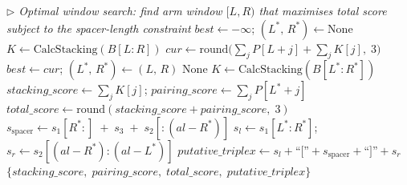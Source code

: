 \documentclass{article}
\begin{document}
\begin{algorithm}
\begin{algorithmic}[1]
\Statex \textit{$\triangleright$ Optimal window search: find arm window $[L, R)$ that maximises total score
         subject to the spacer-length constraint}
\State $\mathit{best} \leftarrow -\infty$;\;
       $(L^*,\, R^*) \leftarrow \mathrm{None}$
            \State $K \leftarrow \mathrm{CalcStacking}(B[L{:}R])$
            \State $\mathit{cur} \leftarrow
                   \mathrm{round}\!\bigl(\textstyle\sum_{j} P[L{+}j]
                   + \textstyle\sum_{j} K[j],\; 3\bigr)$
                \State $\mathit{best} \leftarrow \mathit{cur}$;\;
                       $(L^*,\, R^*) \leftarrow (L,\, R)$
            \EndIf
        \EndIf
    \EndFor
\EndFor
{}
    \State \Return $\mathrm{None}$ 
\EndIf
\State $K \leftarrow \mathrm{CalcStacking}(B[L^*{:}R^*])$
\State $\mathit{stacking\_score} \leftarrow \textstyle\sum_{j} K[j]$;\;
       $\mathit{pairing\_score}  \leftarrow \textstyle\sum_{j} P[L^*{+}j]$
\State $\mathit{total\_score} \leftarrow
       \mathrm{round}(\mathit{stacking\_score} + \mathit{pairing\_score},\; 3)$
\State $s_{\mathrm{spacer}} \leftarrow
       s_1[R^*{:}] \;+\; s_3 \;+\; s_2[{:}(al - R^*)]$
\State $s_l \leftarrow s_1[L^*{:}R^*]$;\;
       $s_r \leftarrow s_2[(al - R^*){:}(al - L^*)]$
\State $\mathit{putative\_triplex} \leftarrow
       s_l + \text{``[''} + s_{\mathrm{spacer}} + \text{``]''} + s_r$
\State \Return $\{\mathit{stacking\_score},\;
                  \mathit{pairing\_score},\;
                  \mathit{total\_score},\;
                  \mathit{putative\_triplex}\}$
\end{algorithmic}
\end{algorithm}
\end{document}
